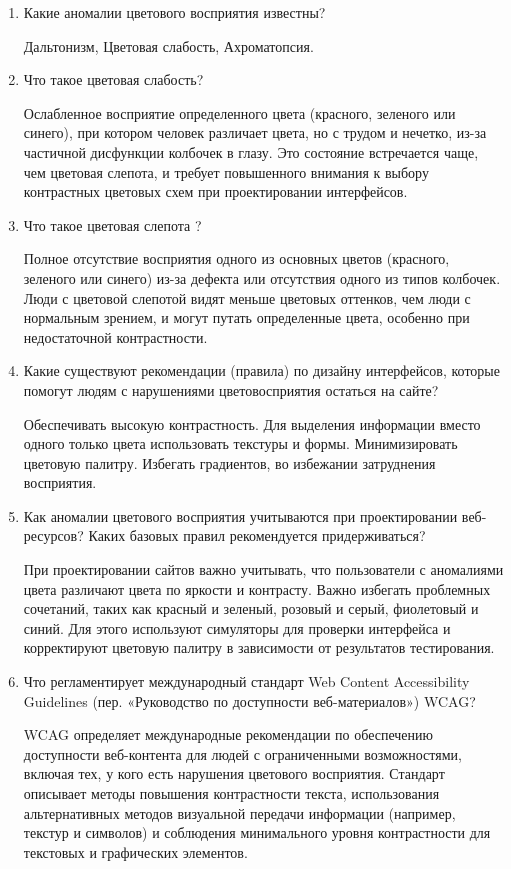 \begin{enumerate}
    \item Какие аномалии цветового восприятия известны?

        Дальтонизм, Цветовая слабость, Ахроматопсия.
    \item Что такое цветовая слабость?

        Ослабленное восприятие определенного цвета (красного, зеленого или синего), при котором человек различает цвета, но с трудом и нечетко, из-за частичной дисфункции колбочек в глазу. Это состояние встречается чаще, чем цветовая слепота, и требует повышенного внимания к выбору контрастных цветовых схем при проектировании интерфейсов.
    \item Что такое цветовая слепота ?

         Полное отсутствие восприятия одного из основных цветов (красного, зеленого или синего) из-за дефекта или отсутствия одного из типов колбочек. Люди с цветовой слепотой видят меньше цветовых оттенков, чем люди с нормальным зрением, и могут путать определенные цвета, особенно при недостаточной контрастности.
    \item Какие существуют рекомендации (правила) по дизайну интерфейсов, которые помогут людям с нарушениями цветовосприятия остаться на  сайте?

        Обеспечивать высокую контрастность. Для выделения информации вместо одного только цвета использовать текстуры и формы. Минимизировать цветовую палитру. Избегать градиентов, во избежании затруднения восприятия.
    \item Как аномалии цветового восприятия учитываются при проектировании веб-ресурсов? Каких базовых правил рекомендуется придерживаться?

        При проектировании сайтов важно учитывать, что пользователи с аномалиями цвета различают цвета по яркости и контрасту. Важно избегать проблемных сочетаний, таких как красный и зеленый, розовый и серый, фиолетовый и синий. Для этого используют симуляторы для проверки интерфейса и корректируют цветовую палитру в зависимости от результатов тестирования.
    \item Что регламентирует международный стандарт Web Content Accessibility Guidelines (пер. «Руководство по доступности веб-материалов») WCAG?

        WCAG определяет международные рекомендации по обеспечению доступности веб-контента для людей с ограниченными возможностями, включая тех, у кого есть нарушения цветового восприятия. Стандарт описывает методы повышения контрастности текста, использования альтернативных методов визуальной передачи информации (например, текстур и символов) и соблюдения минимального уровня контрастности для текстовых и графических элементов.
\end{enumerate}


